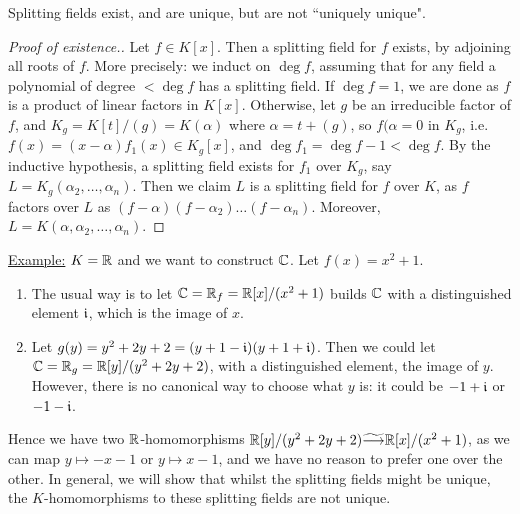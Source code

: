 \documentclass[10pt,a4paper]{article}
\begin{document}
\begin{theorem}
Splitting fields exist, and are unique, but are not ``uniquely unique".
\end{theorem}
\begin{proof}[Proof of existence.]
Let $f \in K[x]$. Then a splitting field for $f$ exists, by adjoining all roots of $f$. More precisely: we induct on $\deg f$, assuming that for any field a polynomial of degree $< \deg f$ has a splitting field. If $\deg f = 1$, we are done as $f$ is a product of linear factors in $K[x]$. Otherwise, let $g$ be an irreducible factor of $f$, and $K_g = K[t]/(g) = K(\alpha)$ where $\alpha=t+(g)$, so $f(\alpha=0$ in $K_g$, i.e. $f(x)=(x-\alpha)f_1(x) \in K_g[x]$, and $\deg f_1 = \deg f -1 <\deg f$. By the inductive hypothesis, a splitting field exists for $f_1$ over $K_g$, say $L = K_g(\alpha_2, \ldots, \alpha_n)$. Then we claim $L$ is a splitting field for $f$ over $K$, as $f$ factors over $L$ as $(f-\alpha)(f-\alpha_2)\ldots(f-\alpha_n)$. Moreover, $L=K(\alpha,\alpha_2, \ldots, \alpha_n)$.
\end{proof}
\underline{Example:} $K=\mathbb{R}$ and we want to construct $\mathbb{C}$. Let $f(x) = x^2 +1$.
\begin{enumerate}
\item The usual way is to let $\mathbb{C} = \mathbb{R}_f = \mathbb{R}[x]/(x^2+1)$ builds $\mathbb{C}$ with a distinguished element $\mathfrak{i}$, which is the image of $x$.
\item Let $g(y) = y^2 + 2y + 2 = (y+1-\mathfrak{i})(y+1+\mathfrak{i})$. Then we could let $\mathbb{C} = \mathbb{R}_g = \mathbb{R}[y]/(y^2+2y+2)$, with a distinguished element, the image of $y$. However, there is no canonical way to choose what $y$ is: it could be $-1+\mathfrak{i}$ or $-1-\mathfrak{i}$. 
\end{enumerate}
 Hence we have two $\mathbb{R}$-homomorphisms $\mathbb{R}[y]/(y^2+2y+2) \widetilde{\longrightarrow} \mathbb{R}[x]/(x^2+1)$, as we can map $y\mapsto -x-1$ or $y\mapsto x-1$, and we have no reason to prefer one over the other. In general, we will show that whilst the splitting fields might be unique, the $K$-homomorphisms to these splitting fields are not unique.
 
\end{document}
